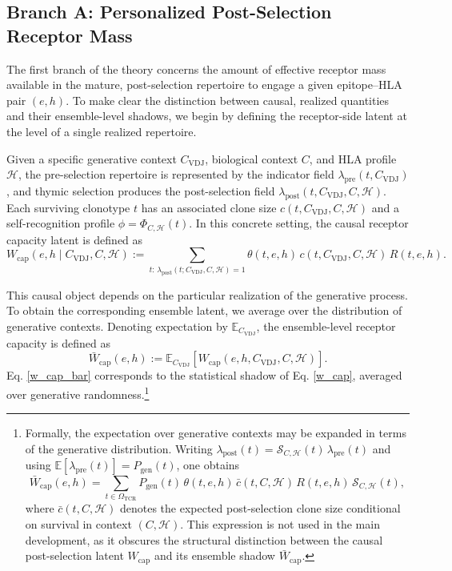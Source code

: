 \documentclass[11pt]{article}
\begin{document}
\subsection{Branch A: Personalized Post-Selection Receptor Mass}

The first branch of the theory concerns the amount of effective receptor mass
available in the mature, post-selection repertoire to engage a given
epitope–HLA pair \((e,h)\). To make clear the distinction between causal,
realized quantities and their ensemble-level shadows, we begin by defining the
receptor-side latent at the level of a single realized repertoire.

Given a specific generative context \(C_{\mathrm{VDJ}}\), biological context
\(C\), and HLA profile \(\mathcal{H}\), the pre-selection repertoire is represented by
the indicator field \(\lambda_{\mathrm{pre}}(t, C_{\mathrm{VDJ}})\), and thymic
selection produces the post-selection field
\(\lambda_{\mathrm{post}}(t, C_{\mathrm{VDJ}},C,\mathcal{H})\). Each surviving
clonotype \(t\) has an associated clone size
\(c(t, C_{\mathrm{VDJ}},C,\mathcal{H})\) and a self-recognition profile
\(\phi = \Phi_{C,\mathcal{H}}(t)\). In this concrete setting, the causal receptor
capacity latent is defined as
\begin{equation}
\label{w_cap}
W_{\mathrm{cap}}(e,h \mid C_{\mathrm{VDJ}},C,\mathcal{H})
:=
\sum_{t:\,\lambda_{\mathrm{post}}(t;C_{\mathrm{VDJ}},C,\mathcal{H})=1}
\theta(t,e,h)\,
c(t, C_{\mathrm{VDJ}},C,\mathcal{H})\,
R(t,e,h).
\end{equation}


This causal object depends on the particular realization of the generative
process. To obtain the corresponding ensemble latent, we average over the
distribution of generative contexts. Denoting expectation by
\(\mathbb{E}_{C_{\mathrm{VDJ}}}\), the ensemble-level receptor capacity is
defined as
\begin{equation}
\label{w_cap_bar}
\bar{W}_{\mathrm{cap}}(e,h)
:=
\mathbb{E}_{C_{\mathrm{VDJ}}}
\!\left[
W_{\mathrm{cap}}(e,h, C_{\mathrm{VDJ}},C,\mathcal{H})
\right].
\end{equation}
Eq. \ref{w_cap_bar} corresponds to the statistical shadow of Eq. \ref{w_cap}, averaged over generative randomness.\footnote{%
Formally, the expectation over generative contexts may be expanded in
terms of the generative distribution.  Writing
$\lambda_{\mathrm{post}}(t)=\mathcal{S}_{C,\mathcal{H}}(t)\,\lambda_{\mathrm{pre}}(t)$
and using $\mathbb{E}[\lambda_{\mathrm{pre}}(t)] = P_{\mathrm{gen}}(t)$, one
obtains
\[
\bar{W}_{\mathrm{cap}}(e,h)
=
\sum_{t\in\Omega_{\mathrm{TCR}}}
P_{\mathrm{gen}}(t)\,
\theta(t,e,h)\,
\bar{c}(t,C,\mathcal{H})\,
R(t,e,h)\,
\mathcal{S}_{C,\mathcal{H}}(t),
\]
where $\bar{c}(t,C,\mathcal{H})$ denotes the expected post-selection clone size
conditional on survival in context $(C,\mathcal{H})$.  This expression is not
used in the main development, as it obscures the structural distinction
between the causal post-selection latent $W_{\mathrm{cap}}$ and its
ensemble shadow $\bar{W}_{\mathrm{cap}}$.}
\end{document}
